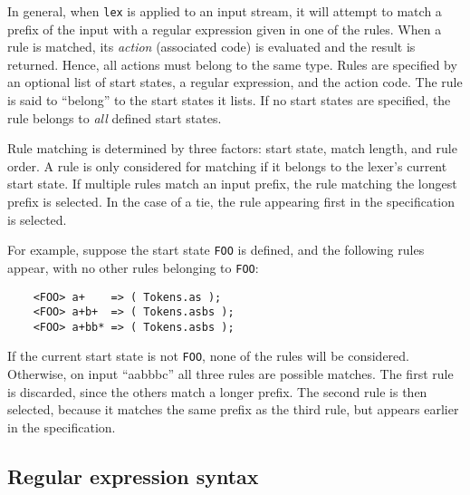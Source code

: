 In general, when \texttt{lex} is applied to an input stream, it will attempt to match a prefix of the input with a regular expression given in one of the rules.  When a rule is matched, its \emph{action} (associated code) is evaluated and the result is returned.  Hence, all actions must belong to the same type. %
Rules are specified by an optional list of start states, a regular expression, and the action code.  The rule is said to ``belong'' to the start states it lists.  If no start states are specified, the rule belongs to \emph{all} defined start states.

Rule matching is determined by three factors: start state, match length, and rule order.  A rule is only considered for matching if it belongs to the lexer's current start state.  If multiple rules match an input prefix, the rule matching the longest prefix is selected.  In the case of a tie, the rule appearing first in the specification is selected.

For example, suppose the start state \texttt{FOO} is defined, and the following rules appear, with no other rules belonging to \texttt{FOO}:
\begin{verbatim}
    <FOO> a+    => ( Tokens.as );
    <FOO> a+b+  => ( Tokens.asbs );
    <FOO> a+bb* => ( Tokens.asbs );
\end{verbatim}
If the current start state is not \texttt{FOO}, none of the rules will be considered.  Otherwise, on input ``aabbbc'' all three rules are possible matches.  The first rule is discarded, since the others match a longer prefix.  The second rule is then selected, because it matches the same prefix as the third rule, but appears earlier in the specification.

\subsection{Regular expression syntax}

